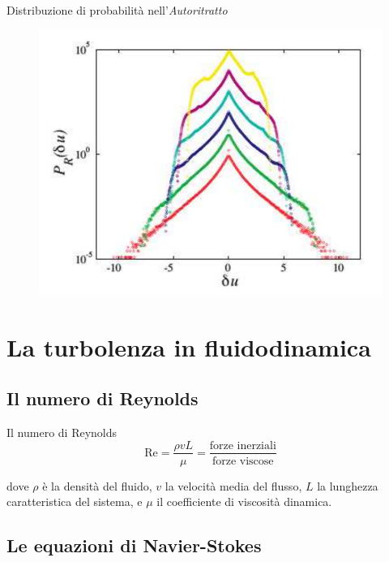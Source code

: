 \documentclass[11pt]{beamer}
\begin{document}
\begin{frame}{Distribuzione di probabilità nell'\emph{Autoritratto}}
\begin{figure}
\centering
\includegraphics[scale=0.3]{PDF_self_portrait.png}
\end{figure}
\end{frame}

\section{La turbolenza in fluidodinamica}

\subsection{Il numero di Reynolds}

\begin{frame}{Il numero di Reynolds}
\begin{equation}
\text{Re} = \frac{\rho v L}{\mu} = \frac{\text{forze inerziali}}{\text{forze viscose}}
\end{equation}

dove $\rho$ è la densità del fluido, $v$ la velocità media del flusso, $L$ la lunghezza caratteristica del sistema, e $\mu$ il coefficiente di viscosità dinamica.
\end{frame}

\subsection{Le equazioni di Navier-Stokes}
\end{document}
